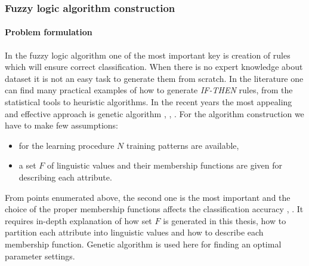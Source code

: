 \subsubsection{Fuzzy logic algorithm construction}
\label{cha:Algorithm_construction_fuzzy_logic}
\paragraph{Problem formulation}
\label{cha:Fuzzy_logic_basic_problem_formulation}
In the fuzzy logic algorithm one of the most important key is creation of rules
which will ensure correct classification. When there is no expert knowledge about
dataset it is not an easy task to generate them from scratch. In the literature
one can find many practical examples of how to generate \textit{IF-THEN} rules, from
the statistical tools to heuristic algorithms. In the recent years the most appealing
and effective approach is genetic algorithm \cite{bib4}, \cite{bib13}, \cite{bib23}.
For the algorithm construction we have to make few assumptions:
\begin{itemize}
    \item for the learning procedure $N$ training patterns are available,
    \item a set $F$ of linguistic values and their membership functions are given
        for describing each attribute.
\end{itemize}

From points enumerated above, the second one is the most important and the choice of the proper membership
functions affects the classification accuracy \cite{bib17}, \cite{bib6}. It requires in-depth explanation
of how set $F$ is generated in this thesis, how to partition each attribute into 
linguistic values and how to describe each membership function. Genetic
algorithm is used here for finding an optimal parameter settings. 

